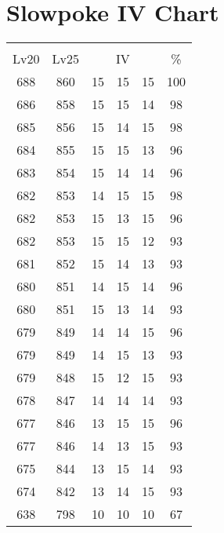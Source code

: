 \documentclass{article}%
\begin{document}
%
\normalsize%
\section{Slowpoke IV Chart}%
\label{sec:Slowpoke IV Chart}%
\renewcommand{\arraystretch}{1.5}%
\begin{tabular}{|c|c|c|c|c|c|}%
\hline%
\multicolumn{6}{|c|}{\textcolor{white}{ 
\linebreak{Slowpoke}
}%
\cellcolor{black}}\\%
\multicolumn{1}{|c}{Lv20}&\multicolumn{1}{c|}{Lv25}&\multicolumn{3}{c|}{IV}&\multicolumn{1}{|c|}{\%}\\%
\hline%
\rowcolor{color100}%
688&860&15&15&15&100\\%
\hline%
\rowcolor{color98}%
686&858&15&15&14&98\\%
\hline%
\rowcolor{color98}%
685&856&15&14&15&98\\%
\hline%
\rowcolor{color96}%
684&855&15&15&13&96\\%
\hline%
\rowcolor{color96}%
683&854&15&14&14&96\\%
\hline%
\rowcolor{color98}%
682&853&14&15&15&98\\%
\hline%
\rowcolor{color96}%
682&853&15&13&15&96\\%
\hline%
\rowcolor{color93}%
682&853&15&15&12&93\\%
\hline%
\rowcolor{color93}%
681&852&15&14&13&93\\%
\hline%
\rowcolor{color96}%
680&851&14&15&14&96\\%
\hline%
\rowcolor{color93}%
680&851&15&13&14&93\\%
\hline%
\rowcolor{color96}%
679&849&14&14&15&96\\%
\hline%
\rowcolor{color93}%
679&849&14&15&13&93\\%
\hline%
\rowcolor{color93}%
679&848&15&12&15&93\\%
\hline%
\rowcolor{color93}%
678&847&14&14&14&93\\%
\hline%
\rowcolor{color96}%
677&846&13&15&15&96\\%
\hline%
\rowcolor{color93}%
677&846&14&13&15&93\\%
\hline%
\rowcolor{color93}%
675&844&13&15&14&93\\%
\hline%
\rowcolor{color93}%
674&842&13&14&15&93\\%
\hline%
\rowcolor{color91}%
638&798&10&10&10&67\\%
\end{tabular}

%
\end{document}
